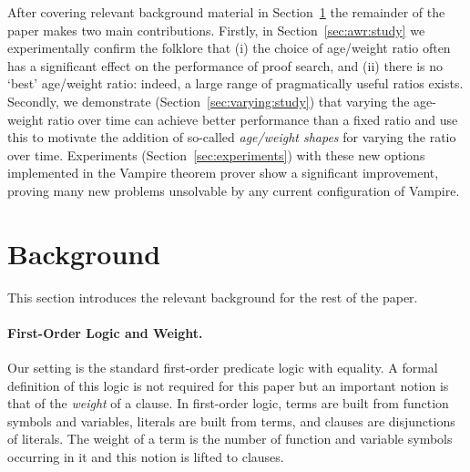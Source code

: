 \documentclass{llncs}
\begin{document}
After covering relevant background material in Section~\ref{sec:background} the remainder of the paper makes two main contributions.
Firstly, in Section~\ref{sec:awr:study} we experimentally confirm the folklore that (i) the choice of age/weight ratio often has a significant effect on the performance of proof search, and (ii) there is no `best' age/weight ratio: indeed, a large range of pragmatically useful ratios exists.
Secondly, we demonstrate (Section~\ref{sec:varying:study}) that varying the age-weight ratio over time can achieve better performance than a fixed ratio and use this to motivate the addition of so-called \emph{age/weight shapes} for varying the ratio over time.
Experiments (Section~\ref{sec:experiments}) with these new options implemented in the Vampire theorem prover show a significant improvement, proving many new problems unsolvable by any current configuration of Vampire.

\section{Background}
\label{sec:background}
This section introduces the relevant background for the rest of the paper.

\paragraph{First-Order Logic and Weight.} Our setting is the standard first-order predicate logic with equality. A formal definition of this logic is not required for this paper but an important notion is that of the \emph{weight} of a clause. In first-order logic,  terms are built from function symbols and variables, literals are built from terms, and clauses are disjunctions of literals. The weight of a term is the number of function and variable symbols occurring in it and this notion is lifted to clauses. 
\end{document}
